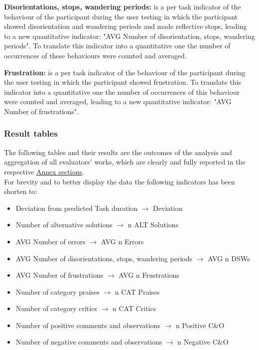 \vspace{0.25cm}

\textbf{Disorientations, stops, wandering periods:} is a per task indicator of the behaviour of the participant during the user testing in which the participant showed disorientation and wandering periods and made reflective stops, leading to a new quantitative indicator: "AVG Number of disorientation, stops, wandering periods". To translate this indicator into a quantitative one the number of occurrences of these behaviours were counted  and averaged.

\vspace{0.25cm}

\textbf{Frustration:} is a per task indicator of the behaviour of the participant during the user testing in which the participant showed frustration. To translate this indicator into a quantitative one the number of occurrences of this behaviour were counted and averaged, leading to a new quantitative indicator: "AVG Number of frustrations".

\newpage

\subsubsection*{Result tables}
The following tables and their results are the outcomes of the analysis and aggregation of all evaluators' works, which are clearly and fully reported in the respective \hyperref[sec:annex]{Annex sections}.\\
For brevity and to better display the data the following indicators has been shorten to:
\begin{itemize}
	\item Deviation from predicted Task duration $\rightarrow$ Deviation
	\item Number of alternative solutions $\rightarrow$ n ALT Solutions
	\item AVG Number of errors $\rightarrow$ AVG n Errors
	\item AVG Number of disorientations, stops, wandering periods $\rightarrow$ AVG n DSWs
	\item AVG Number of frustrations $\rightarrow$ AVG n Frustrations
	\item Number of category praises $\rightarrow$ n CAT Praises
	\item Number of category critics $\rightarrow$ n CAT Critics
	\item Number of positive comments and observations $\rightarrow$ n Positive C\&O
	\item Number of negative comments and observations $\rightarrow$ n Negative C\&O
\end{itemize}

